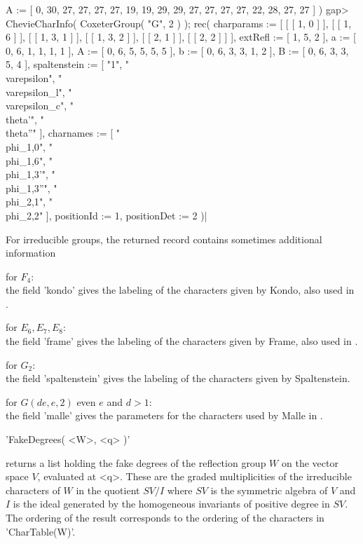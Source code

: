       A := [ 0, 30, 27, 27, 27, 27, 19, 19, 29, 29, 27, 27, 27, 27, 22,
          28, 27, 27 ] )
    gap>  ChevieCharInfo( CoxeterGroup( "G", 2 ) );
    rec(
      charparams :=
       [ [ [ 1, 0 ] ], [ [ 1, 6 ] ], [ [ 1, 3, 1 ] ], [ [ 1, 3, 2 ] ],
          [ [ 2, 1 ] ], [ [ 2, 2 ] ] ],
      extRefl := [ 1, 5, 2 ],
      a := [ 0, 6, 1, 1, 1, 1 ],
      A := [ 0, 6, 5, 5, 5, 5 ],
      b := [ 0, 6, 3, 3, 1, 2 ],
      B := [ 0, 6, 3, 3, 5, 4 ],
      spaltenstein :=
       [ "1", "\\varepsilon", "\\varepsilon_l", "\\varepsilon_c",
          "\\theta'", "\\theta''" ],
      charnames := [ "\\phi_{1,0}", "\\phi_{1,6}", "\\phi_{1,3}'",
          "\\phi_{1,3}''", "\\phi_{2,1}", "\\phi_{2,2}" ],
      positionId := 1,
      positionDet := 2 )|

For  irreducible groups, the returned  record contains sometimes additional
information\:

for  $F_4$:\\ the field 'kondo' gives  the labeling of the characters given
  by Kondo, also used in \cite[(4.10)]{Lus85}.

for  $E_6,  E_7,  E_8$:\\  the  field  'frame'  gives  the  labeling of the
  characters  given  by  Frame,  also  used  in  \cite[(4.11),  (4.12), and
  (4.13)]{Lus85}.

for  $G_2$:\\ the field 'spaltenstein' gives the labeling of the characters
  given by Spaltenstein.

for  $G(de,e,2)$  even  $e$  and  $d>1$:\\  the  field  'malle'  gives  the
  parameters for the characters used by Malle in \cite{Mal96}.


'FakeDegrees( <W>, <q> )'

returns  a list holding the fake degrees of the reflection group $W$ on the
vector  space $V$, evaluated at <q>. These are the graded multiplicities of
the  irreducible characters of $W$ in the quotient $SV/I$ where $SV$ is the
symmetric  algebra of $V$ and $I$ is the ideal generated by the homogeneous
invariants  of  positive  degree  in  $SV$.  The  ordering  of  the  result
corresponds to the ordering of the characters in 'CharTable(W)'.

